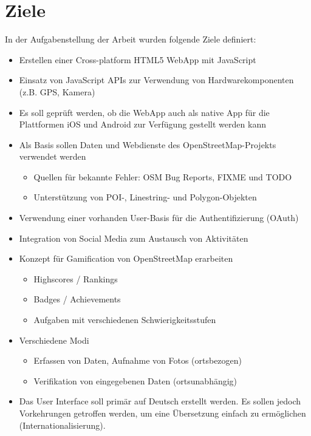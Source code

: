 \section{Ziele}
In der Aufgabenstellung der Arbeit wurden folgende Ziele definiert:
\begin{itemize}
	\item Erstellen einer Cross-platform HTML5 WebApp mit JavaScript
	\item Einsatz von JavaScript APIs zur Verwendung von Hardwarekomponenten (z.B. GPS, Kamera)
	\item Es soll geprüft werden, ob die WebApp auch als native App für die Plattformen iOS und Android zur Verfügung gestellt werden kann 
	\item Als Basis sollen Daten und Webdienste des \gls{OpenStreetMap}-Projekts verwendet werden
	\begin{itemize}
		\item Quellen für bekannte Fehler: OSM Bug Reports, FIXME und TODO
		\item Unterstützung von POI-, Linestring- und Polygon-Objekten
	\end{itemize}
	\item Verwendung einer vorhanden User-Basis für die Authentifizierung (OAuth)
	\item Integration von Social Media zum Austausch von Aktivitäten
	\item Konzept für Gamification von \gls{OpenStreetMap} erarbeiten
	\begin{itemize}
		\item Highscores / Rankings
		\item Badges / Achievements
		\item Aufgaben mit verschiedenen Schwierigkeitsstufen
	\end{itemize}
	\item Verschiedene Modi
	\begin{itemize}
		\item Erfassen von Daten, Aufnahme von Fotos (ortsbezogen)
		\item Verifikation von eingegebenen Daten (ortsunabhängig)
	\end{itemize}
	\item Das User Interface soll primär auf Deutsch erstellt werden. Es sollen jedoch Vorkehrungen getroffen werden, um eine Übersetzung einfach zu ermöglichen (Internationalisierung).
\end{itemize}

